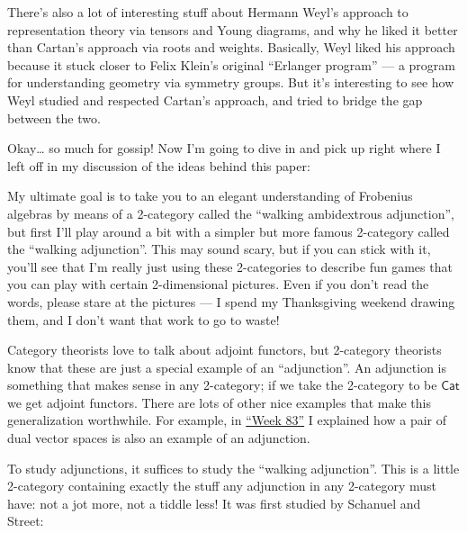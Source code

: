 \documentclass{article}
\def\tightlist{}
\renewcommand{\texttt}[1]{%
  \begingroup
  \ttfamily
  \begingroup\lccode`~=`/\lowercase{\endgroup\def~}{/\discretionary{}{}{}}%
  \begingroup\lccode`~=`[\lowercase{\endgroup\def~}{[\discretionary{}{}{}}%
  \begingroup\lccode`~=`.\lowercase{\endgroup\def~}{.\discretionary{}{}{}}%
  \catcode`/=\active\catcode`[=\active\catcode`.=\active
  \scantokens{#1\noexpand}%
  \endgroup
}
\begin{document}
There's also a lot of interesting stuff about Hermann Weyl's approach to
representation theory via tensors and Young diagrams, and why he liked
it better than Cartan's approach via roots and weights. Basically, Weyl
liked his approach because it stuck closer to Felix Klein's original
``Erlanger program'' --- a program for understanding geometry via
symmetry groups. But it's interesting to see how Weyl studied and
respected Cartan's approach, and tried to bridge the gap between the
two.

Okay\ldots{} so much for gossip! Now I'm going to dive in and pick up
right where I left off in my discussion of the ideas behind this paper:


My ultimate goal is to take you to an elegant understanding of Frobenius
algebras by means of a 2-category called the ``walking ambidextrous
adjunction'', but first I'll play around a bit with a simpler but more
famous 2-category called the ``walking adjunction''. This may sound
scary, but if you can stick with it, you'll see that I'm really just
using these 2-categories to describe fun games that you can play with
certain 2-dimensional pictures. Even if you don't read the words, please
stare at the pictures --- I spend my Thanksgiving weekend drawing them,
and I don't want that work to go to waste!

Category theorists love to talk about adjoint functors, but 2-category
theorists know that these are just a special example of an
``adjunction''. An adjunction is something that makes sense in any
2-category; if we take the 2-category to be \(\mathsf{Cat}\) we get
adjoint functors. There are lots of other nice examples that make this
generalization worthwhile. For example, in
\protect\hyperlink{week83}{``Week 83''} I explained how a pair of dual
vector spaces is also an example of an adjunction.

To study adjunctions, it suffices to study the ``walking adjunction''.
This is a little 2-category containing exactly the stuff any adjunction
in any 2-category must have: not a jot more, not a tiddle less! It was
first studied by Schanuel and Street:
\end{document}
